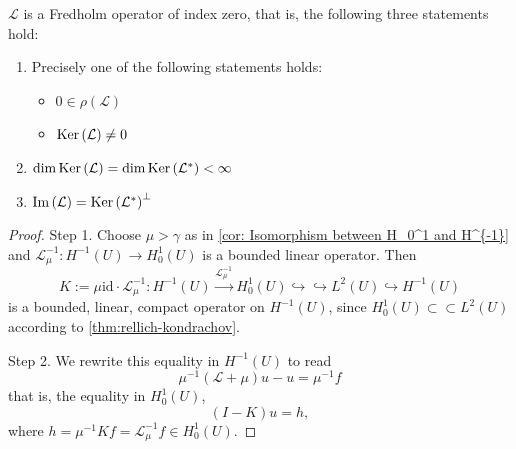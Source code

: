 \begin{theorem}
    \label{thm: Second existence theorem of weak solution}
    $\mathcal{L}$ is a Fredholm operator of index zero, that is, the following three statements hold:
    \begin{enumerate}
        \item Precisely one of the following statements holds:
              \begin{itemize}[left=0em]
                  \item $0\in \rho(\mathcal{L})$
                  \item $\operatorname{\operatorname{Ker}}\left( \mathcal{L} \right)\neq 0$
              \end{itemize}

        \item $\dim \operatorname{\operatorname{Ker}}\left( \mathcal{L} \right)= \dim \operatorname{\operatorname{Ker}}\left( \mathcal{L}^* \right)<\infty$

        \item $\Im\left( \mathcal{L} \right)=\operatorname{\operatorname{Ker}}\left( \mathcal{L}^* \right)^\bot$
    \end{enumerate}

    \begin{proof}
        Step 1.
        Choose $\mu>\gamma$ as in \ref{cor: Isomorphism between H_0^1 and H^{-1}} and $\mathcal{L}_\mu^{-1}: H^{-1}(U) \rightarrow H_0^1(U)$ is a bounded linear operator. Then
        \begin{equation*}
            K
            :=
            \mu \mathrm{id} \cdot  \mathcal{L}_\mu ^{-1}:
            H^{-1}(U) \xrightarrow{\mathcal{L}_\mu^{-1}} H_0^1(U)\hookrightarrow\hookrightarrow L^2 (U)
            \hookrightarrow H^{-1}\left(U\right)
        \end{equation*}
        is a bounded, linear, compact operator on $H^{-1}\left(U\right)$, since $H_0^1(U) \subset \subset L^2(U)$ according to \ref{thm:rellich-kondrachov}.

        Step 2.
        We rewrite this equality in $H^{-1}\left(U\right)$ to read
        \begin{equation*}
            \mu^{-1}\left(\mathcal{L}+\mu\right)u- u=\mu^{-1} f
        \end{equation*}
        that is, the equality in $H_0^1\left(U\right)$,
        \begin{equation*}
            \left(I-K\right) u = h,
        \end{equation*}
        where $h= \mu^{-1} Kf = \mathcal{L}_\mu^{-1}f \in H_0^1\left(U\right)$.


\end{proof}
\end{theorem}
